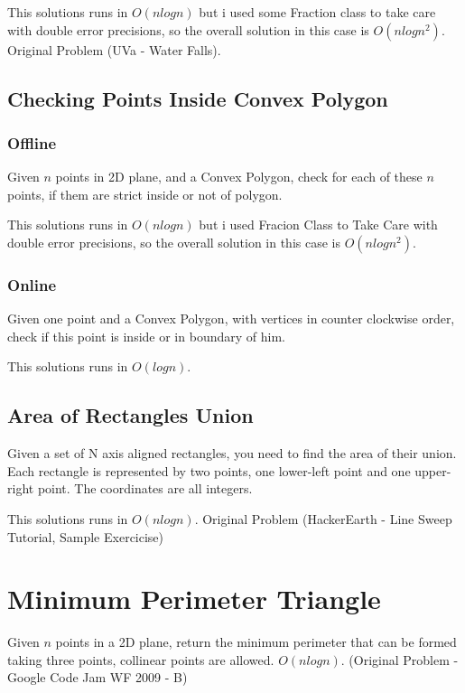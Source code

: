 \documentclass{report}
\begin{document}
        This solutions runs in $O(nlogn)$ but i used some Fraction class to take care with double error precisions, so the overall solution in this case is $O(nlogn^2)$. Original Problem (UVa - Water Falls).
        
        
        
        \subsection{Checking Points Inside Convex Polygon}
            \subsubsection{Offline}
            Given $n$ points in 2D plane, and a Convex Polygon, check for each of these $n$ points, if them are strict inside or not of polygon.
            
            This solutions runs in $O(nlogn)$ but i used Fracion Class to Take Care with double error precisions, so the overall solution in this case is $O(nlogn^2)$.
            
            
            
            \subsubsection{Online}
            Given one point and a Convex Polygon, with vertices in counter clockwise order, check if this point is inside or in boundary of him.
            
            This solutions runs in $O(logn)$.
            
            
        
        \subsection{Area of Rectangles Union}
        Given a set of N axis aligned rectangles, you need to find the area of their union. Each rectangle is represented by two points, one lower-left point and one upper-right point. The coordinates are all integers.
        
        This solutions runs in $O(nlogn)$. Original Problem (HackerEarth - Line Sweep Tutorial, Sample Exercicise)
    \section{Minimum Perimeter Triangle}
    Given $n$ points in a 2D plane, return the minimum perimeter that can be formed taking three points, collinear points are allowed. $O(nlogn)$. (Original Problem - Google Code Jam WF 2009 - B)
    
    
\end{document}

